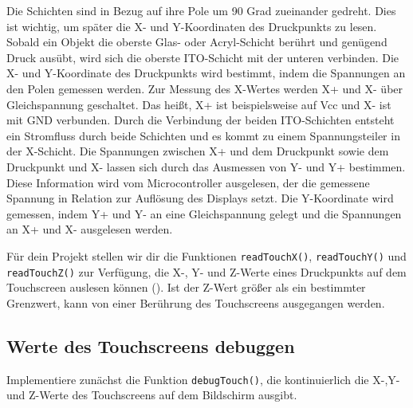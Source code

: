 Die Schichten sind in Bezug auf ihre Pole um 90 Grad zueinander gedreht.
Dies ist wichtig, um später die X- und Y-Koordinaten des Druckpunkts zu lesen.
Sobald ein Objekt die oberste Glas- oder Acryl-Schicht berührt und genügend Druck ausübt, wird sich die oberste ITO-Schicht mit der unteren verbinden.
Die X- und Y-Koordinate des Druckpunkts wird bestimmt, indem die Spannungen an den Polen gemessen werden.
Zur Messung des X-Wertes werden X+ und X- über Gleichspannung geschaltet.
Das heißt, X+ ist beispielsweise auf Vcc und X- ist mit GND verbunden.
Durch die Verbindung der beiden ITO-Schichten entsteht ein Stromfluss durch beide Schichten und es kommt zu einem Spannungsteiler in der X-Schicht.
Die Spannungen zwischen X+ und dem Druckpunkt sowie dem Druckpunkt und X- lassen sich durch das Ausmessen von Y- und Y+ bestimmen.
Diese Information wird vom Microcontroller ausgelesen, der die gemessene Spannung in Relation zur Auflösung des Displays setzt.
Die Y-Koordinate wird gemessen, indem Y+ und Y- an eine Gleichspannung gelegt und die Spannungen an X+ und X- ausgelesen werden.

Für dein Projekt stellen wir dir die Funktionen \lstinline|readTouchX()|, \lstinline|readTouchY()| und \lstinline|readTouchZ()| zur Verfügung, die X-, Y- und Z-Werte eines Druckpunkts auf dem Touchscreen auslesen können ().
Ist der Z-Wert größer als ein bestimmter Grenzwert, kann von einer Berührung des Touchscreens ausgegangen werden. 


\subsection{Werte des Touchscreens debuggen}
Implementiere zunächst die Funktion \lstinline|debugTouch()|, die kontinuierlich die X-,Y- und Z-Werte des Touchscreens auf dem Bildschirm ausgibt.

